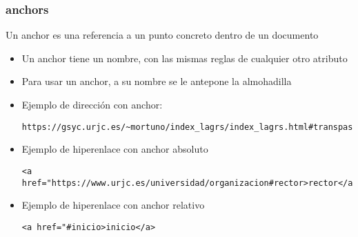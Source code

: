 \documentclass[ucs]{beamer}
\begin{document}
\begin{frame}[fragile]
\frametitle{anchors}
Un anchor es una referencia a un punto concreto dentro de un documento
\begin{itemize}
\item
Un anchor tiene un nombre, con las mismas reglas de cualquier otro atributo

\item
Para usar un anchor, a su nombre se le antepone la almohadilla

\item
Ejemplo de dirección con anchor:
  \begin{scriptsize}
  \begin{verbatim}
https://gsyc.urjc.es/~mortuno/index_lagrs/index_lagrs.html#transpas
  \end{verbatim}
  \end{scriptsize}

\item
Ejemplo de hiperenlace con anchor absoluto
  \begin{scriptsize}
  \begin{verbatim}
<a href="https://www.urjc.es/universidad/organizacion#rector>rector</a>
  \end{verbatim}
  \end{scriptsize}


\item
Ejemplo de hiperenlace con anchor relativo
  \begin{scriptsize}
  \begin{verbatim}
<a href="#inicio>inicio</a>
  \end{verbatim}
  \end{scriptsize}


\end{itemize}

\end{frame}
\end{document}
